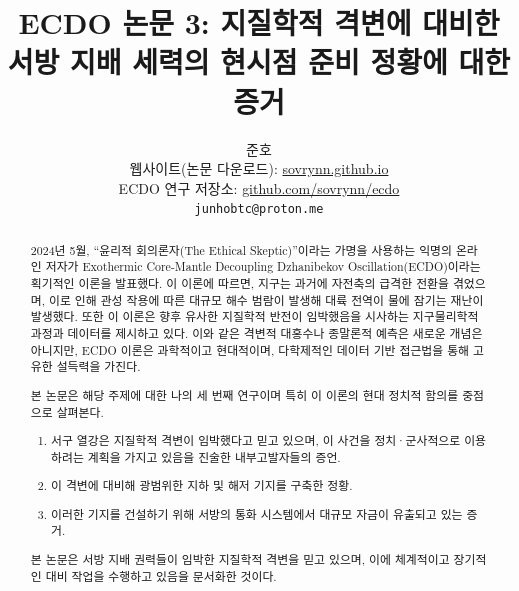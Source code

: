\documentclass[10pt,twocolumn,letterpaper]{article}
\begin{document}
\title{ECDO 논문 3: 지질학적 격변에 대비한 서방 지배 세력의 현시점 준비 정황에 대한 증거}

\author{준호\\
웹사이트(논문 다운로드): \href{https://sovrynn.github.io}{sovrynn.github.io}\\
ECDO 연구 저장소: \href{https://github.com/sovrynn/ecdo}{github.com/sovrynn/ecdo}\\
{\tt\small junhobtc@proton.me}
}

\maketitle

\begin{abstract}
2024년 5월, “윤리적 회의론자(The Ethical Skeptic)”이라는 가명을 사용하는 익명의 온라인 저자가 Exothermic Core-Mantle Decoupling Dzhanibekov Oscillation(ECDO)이라는 획기적인 이론을 발표했다\cite{0,1}. 이 이론에 따르면, 지구는 과거에 자전축의 급격한 전환을 겪었으며, 이로 인해 관성 작용에 따른 대규모 해수 범람이 발생해 대륙 전역이 물에 잠기는 재난이 발생했다. 또한 이 이론은 향후 유사한 지질학적 반전이 임박했음을 시사하는 지구물리학적 과정과 데이터를 제시하고 있다. 이와 같은 격변적 대홍수나 종말론적 예측은 새로운 개념은 아니지만, ECDO 이론은 과학적이고 현대적이며, 다학제적인 데이터 기반 접근법을 통해 고유한 설득력을 가진다.

본 논문은 해당 주제에 대한 나의 세 번째 연구\cite{2,3}이며 특히 이 이론의 현대 정치적 함의를 중점으로 살펴본다.

\begin{flushleft}
\begin{enumerate}
    \item 서구 열강은 지질학적 격변이 임박했다고 믿고 있으며, 이 사건을 정치·군사적으로 이용하려는 계획을 가지고 있음을 진술한 내부고발자들의 증언.
    \item 이 격변에 대비해 광범위한 지하 및 해저 기지를 구축한 정황.
    \item 이러한 기지를 건설하기 위해 서방의 통화 시스템에서 대규모 자금이 유출되고 있는 증거.
\end{enumerate}
\end{flushleft}

본 논문은 서방 지배 권력들이 임박한 지질학적 격변을 믿고 있으며, 이에 체계적이고 장기적인 대비 작업을 수행하고 있음을 문서화한 것이다.
\end{abstract}
\end{document}
